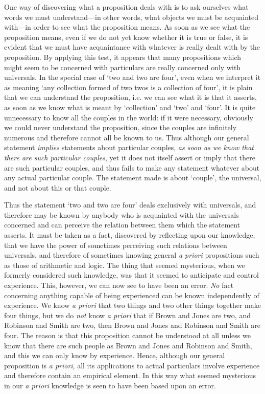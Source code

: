 \documentclass[oneside,letterpaper,12pt]{book}
\begin{document}
\label{discovering} One way of discovering what a proposition deals with is to ask ourselves
what words we must understand---in other words, what objects we must be
acquainted with---in order to see what the proposition means. As soon as
we see what the proposition means, even if we do not yet know whether it
is true or false, it is evident that we must have acquaintance with
whatever is really dealt with by the proposition. By applying this test,
it appears that many propositions which might seem to be concerned with
particulars are really concerned only with universals. In the special
case of `two and two are four', even when
we interpret it as meaning `any collection formed of two
twos is a collection of four', it is plain that we can
understand the proposition, i.e. we can see what it is that it asserts,
as soon as we know what is meant by
`collection' and
`two' and
`four'. It is quite unnecessary to know
all the couples in the world: if it were necessary, obviously we could
never understand the proposition, since the couples are infinitely
numerous and therefore cannot all be known to us. Thus although our
general statement \emph{implies} statements about particular couples,
\emph{as soon as we know that there are such particular couples}, yet it
does not itself assert or imply that there are such particular couples,
and thus fails to make any statement whatever about any actual
particular couple. The statement made is about
`couple', the universal, and not about
this or that couple.

Thus the statement `two and two are
four' deals exclusively with universals, and therefore
may be known by anybody who is acquainted with the universals concerned
and can perceive the relation between them which the statement asserts.
It must be taken as a fact, discovered by reflecting upon our knowledge,
that we have the power of sometimes perceiving such relations between
universals, and therefore of sometimes knowing general \emph{a priori}
propositions such as those of arithmetic and logic. The thing that
seemed mysterious, when we formerly considered such knowledge, was that
it seemed to anticipate and control experience. This, however, we can
now see to have been an error. \emph{No} fact concerning anything
capable of being experienced can be known independently of experience.
We know \emph{a priori} that two things and two other things together
make four things, but we do \emph{not} know \emph{a priori} that if
Brown and Jones are two, and Robinson and Smith are two, then Brown and
Jones and Robinson and Smith are four. The reason is that this
proposition cannot be understood at all unless we know that there are
such people as Brown and Jones and Robinson and Smith, and this we can
only know by experience. Hence, although our general proposition is
\emph{a priori}, all its applications to actual particulars involve
experience and therefore contain an empirical element. In this way what
seemed mysterious in our \emph{a priori} knowledge is seen to have been
based upon an error.
\end{document}
